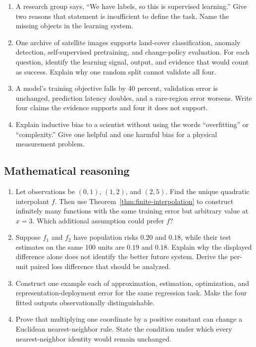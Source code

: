\begin{enumerate}[label=\textbf{MLF-I\arabic*.},leftmargin=*,itemsep=0.65em]
  \item A research group says, ``We have labels, so this is supervised
  learning.'' Give two reasons that statement is insufficient to define the
  task. Name the missing objects in the learning system.
  \item One archive of satellite images supports land-cover classification,
  anomaly detection, self-supervised pretraining, and change-policy evaluation.
  For each question, identify the learning signal, output, and evidence that
  would count as success. Explain why one random split cannot validate all four.
  \item A model's training objective falls by 40 percent, validation error is
  unchanged, prediction latency doubles, and a rare-region error worsens.
  Write four claims the evidence supports and four it does not support.
  \item Explain inductive bias to a scientist without using the words
  ``overfitting'' or ``complexity.'' Give one helpful and one harmful bias for a
  physical measurement problem.
\end{enumerate}

\subsection*{Mathematical reasoning}

\begin{enumerate}[label=\textbf{MLF-M\arabic*.},leftmargin=*,itemsep=0.65em]
  \item Let observations be $(0,1)$, $(1,2)$, and $(2,5)$. Find the unique
  quadratic interpolant $f$. Then use Theorem~\ref{thm:finite-interpolation} to
  construct infinitely many functions with the same training error but
  arbitrary value at $x=3$. Which additional assumption could prefer $f$?
  \item Suppose $f_1$ and $f_2$ have population risks $0.20$ and $0.18$, while
  their test estimates on the same 100 units are $0.19$ and $0.18$. Explain why
  the displayed difference alone does not identify the better future system.
  Derive the per-unit paired loss difference that should be analyzed.
  \item Construct one example each of approximation, estimation, optimization,
  and representation-deployment error for the same regression task. Make the
  four fitted outputs observationally distinguishable.
  \item Prove that multiplying one coordinate by a positive constant can change
  a Euclidean nearest-neighbor rule. State the condition under which every
  nearest-neighbor identity would remain unchanged.
\end{enumerate}

